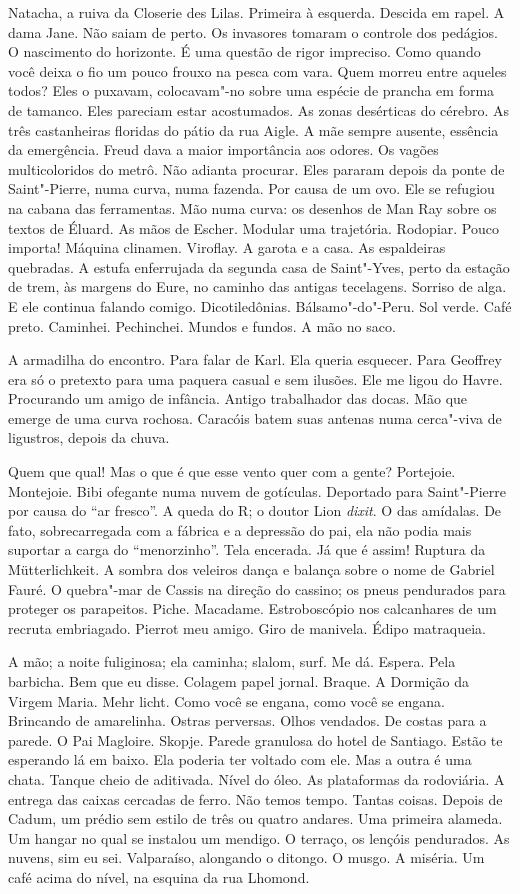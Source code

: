 Natacha, a ruiva da Closerie des Lilas. Primeira à esquerda. Descida em
rapel. A dama Jane. Não saiam de perto. Os invasores tomaram o controle
dos pedágios. O nascimento do horizonte. É uma questão de rigor
impreciso. Como quando você deixa o fio um pouco frouxo na pesca com
vara. Quem morreu entre aqueles todos? Eles o puxavam, colocavam"-no
sobre uma espécie de prancha em forma de tamanco. Eles pareciam estar
acostumados. As zonas desérticas do cérebro. As três castanheiras
floridas do pátio da rua Aigle. A mãe sempre ausente, essência da
emergência. Freud dava a maior importância aos odores. Os vagões
multicoloridos do metrô. Não adianta procurar. Eles pararam depois da
ponte de Saint"-Pierre, numa curva, numa fazenda. Por causa de um ovo.
Ele se refugiou na cabana das ferramentas. Mão numa curva: os desenhos
de Man Ray sobre os textos de Éluard. As mãos de Escher. Modular uma
trajetória. Rodopiar. Pouco importa! Máquina clinamen. Viroflay. A
garota e a casa. As espaldeiras quebradas. A estufa enferrujada da
segunda casa de Saint"-Yves, perto da estação de trem, às margens do
Eure, no caminho das antigas tecelagens. Sorriso de alga. E ele continua
falando comigo. Dicotiledônias. Bálsamo"-do"-Peru. Sol verde. Café preto.
Caminhei. Pechinchei. Mundos e fundos. A mão no saco.

A armadilha do encontro. Para falar de Karl. Ela queria esquecer. Para
Geoffrey era só o pretexto para uma paquera casual e sem ilusões. Ele me
ligou do Havre. Procurando um amigo de infância. Antigo trabalhador das
docas. Mão que emerge de uma curva rochosa. Caracóis batem suas antenas
numa cerca"-viva de ligustros, depois da chuva.

Quem que qual! Mas o que é que esse vento quer com a gente? Portejoie.
Montejoie. Bibi ofegante numa nuvem de gotículas. Deportado para
Saint"-Pierre por causa do ``ar fresco''. A queda do R; o doutor Lion
\emph{dixit}. O das amídalas. De fato, sobrecarregada com a fábrica e a
depressão do pai, ela não podia mais suportar a carga do ``menorzinho''.
Tela encerada. Já que é assim! Ruptura da Mütterlichkeit. A sombra dos
veleiros dança e balança sobre o nome de Gabriel Fauré. O quebra"-mar de
Cassis na direção do cassino; os pneus pendurados para proteger os
parapeitos. Piche. Macadame. Estroboscópio nos calcanhares de um recruta
embriagado. Pierrot meu amigo. Giro de manivela. Édipo matraqueia.

A mão; a noite fuliginosa; ela caminha; slalom, surf. Me dá. Espera.
Pela barbicha. Bem que eu disse. Colagem papel jornal. Braque. A
Dormição da Virgem Maria. Mehr licht. Como você se engana, como você se
engana. Brincando de amarelinha. Ostras perversas. Olhos vendados. De
costas para a parede. O Pai Magloire. Skopje. Parede granulosa do hotel
de Santiago. Estão te esperando lá em baixo. Ela poderia ter voltado com
ele. Mas a outra é uma chata. Tanque cheio de aditivada. Nível do óleo.
As plataformas da rodoviária. A entrega das caixas cercadas de ferro.
Não temos tempo. Tantas coisas. Depois de Cadum, um prédio sem estilo de
três ou quatro andares. Uma primeira alameda. Um hangar no qual se
instalou um mendigo. O terraço, os lençóis pendurados. As nuvens, sim eu
sei. Valparaíso, alongando o ditongo. O musgo. A miséria. Um café acima
do nível, na esquina da rua Lhomond.

